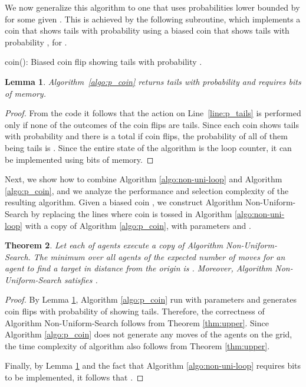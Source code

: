 \documentclass[11pt]{article}
\newtheorem{theorem}{Theorem}[section]
\newtheorem{lemma}[theorem]{Lemma}
\begin{document}
We now generalize this algorithm to one that uses probabilities lower bounded by  for some given . This is achieved by the following subroutine, which implements a coin that shows tails with probability  using a biased coin that shows tails with probability , for . 

\begin{algorithm}
\caption{coin(): Biased coin flip showing tails with probability .}
\label{algo:p_coin}
\For{} {
	{
	\phantom{Xp}
	}
}
\phantom{Xp}
\end{algorithm}

\begin{lemma}
\label{lem:p_coin}
	Algorithm~\ref{algo:p_coin} returns tails with probability  and requires  bits of memory.
\end{lemma}
\begin{proof}
	From the code it follows that the action on Line~\ref{line:p_tails} is performed only if none of the outcomes of the coin flips are tails. Since each coin shows tails with probability  and there is a total if  coin flips, the probability of all of them being tails is . Since the entire state of the algorithm is the loop counter, it can be implemented using  bits of memory.
\end{proof}


Next, we show how to combine Algorithm \ref{algo:non-uni-loop} and Algorithm \ref{algo:p_coin}, and we analyze the performance and selection complexity of the resulting algorithm. Given a biased coin , we construct Algorithm Non-Uniform-Search  by replacing the lines where coin  is tossed in Algorithm \ref{algo:non-uni-loop} with a copy of Algorithm \ref{algo:p_coin}, with parameters  and .


\begin{theorem}
\label{thm:algoA}
Let each of  agents execute a copy of Algorithm Non-Uniform-Search. The minimum over all agents of the expected number of moves for an agent to find a target in distance  from the origin is . Moreover, Algorithm Non-Uniform-Search satisfies .
\end{theorem}

\begin{proof}
	 By Lemma \ref{lem:p_coin}, Algorithm \ref{algo:p_coin} run with parameters  and  generates coin flips with probability  of showing tails. Therefore, the correctness of Algorithm Non-Uniform-Search follows from Theorem \ref{thm:upper}. Since Algorithm \ref{algo:p_coin} does not generate any moves of the agents on the grid, the time complexity of algorithm also follows from Theorem \ref{thm:upper}. 
	 
	 Finally, by Lemma \ref{lem:p_coin} and the fact that Algorithm \ref{algo:non-uni-loop} requires  bits to be implemented, it follows that .
\end{proof}
\end{document}
